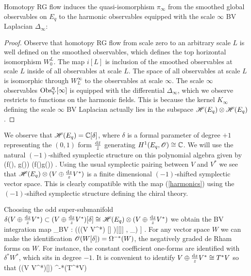 \documentclass[10pt]{amsart}
\begin{document}
\begin{lem} Homotopy RG flow induces the quasi-isomorphism $\pi_\infty$ from the smoothed global observables on $E_q$ to the harmonic observables equipped with the scale $\infty$ BV Laplacian $\Delta_\infty$:
\ben
{}
\een 
\end{lem}
\begin{proof}
Observe that homotopy RG flow from scale zero to an arbitrary scale $L$ is well defined on the smoothed observables, which defines the top horizontal isomorphism $W_0^L$. 
The map $i[L]$ is inclusion of the smoothed observables at scale $L$ inside of all observables at scale $L$. 
The space of all observables at scale $L$ is isomorphic through $W_L^\infty$ to the observables at scale $\infty$. 
The scale $\infty$ observables ${\rm Obs}_V^{\rm q}[\infty]$ is equipped with the differential $\Delta_\infty$, which we observe restricts to functions on the harmonic fields. 
This is because the kernel $K_\infty$ defining the scale $\infty$ BV Laplacian actually lies in the subspace $\mathscr H(E_q) \otimes \mathscr H(E_q)$. 
\end{proof}

We observe that $\mathscr H(E_q) = \mathbb C[\delta]$, where $\delta$ is a formal parameter of degree $+1$ representing the $(0,1)$ form $\frac{{\rm d} \Bar{z}}{\Bar{z}}$ generating $H^1(E_q , \mathscr O) \cong \mathbb C$. 
We will use the natural $(-1)$-shifted symplectic structure on this polynomial algebra given by 
\ben
(f(\delta), g(\delta)) \mapsto \frac{\partial}{\partial \delta} \left(f(\delta)g(\delta)\right) .
\een 
Using the usual symplectic pairing between $V$ and $V^*$ we see that $\mathscr H(E_q) \otimes (V \oplus \frac{{\rm d} z}{z} V^*)$ is a finite dimensional $(-1)$-shifted symplectic vector space. 
This is clearly compatible with the map (\ref{harmonics}) using the $(-1)$-shifted symplectic structure defining the chiral theory. 

Choosing the odd super-submanifold $\delta (V \oplus \frac{{\rm d} z}{z} V^*) \subset (V \oplus \frac{{\rm d} z}{z} V^*)[\delta] \cong \mathscr H(E_q) \otimes (V \oplus \frac{{\rm d} z}{z} V^*)$ we obtain the BV integration map 
\ben
\int_{BV} : \left(\sO\left((V \oplus {} V^*) [\delta] \right)[[\hbar]] , \hbar \Delta_\infty\right) \to \CC[[\hbar]] .
\een
For any vector space $W$ we can make the identification $\mathscr O(W[\delta]) = \Omega^{-*}(W)$, the negatively graded de Rham forms on $W$. 
For instance, the constant coefficient one-forms are identified with $\delta^* W^*$, which sits in degree $-1$. 
It is convenient to identify $V \oplus \frac{{\rm d} z}{z} V^* \cong T^*V$ so that
\ben
\sO\left((V \oplus {} V^*)[\delta]\right) \cong \Omega^{-*}(T^*V)
\een
 
\end{document}

